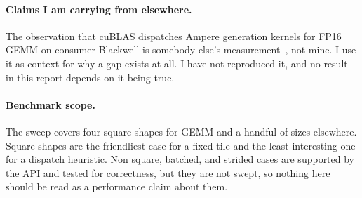 \paragraph{Claims I am carrying from elsewhere.} The observation that cuBLAS
dispatches Ampere generation kernels for FP16 GEMM on consumer Blackwell is
somebody else's measurement~\cite{cloudrift}, not mine. I use it as context for why
a gap exists at all. I have not reproduced it, and no result in this report depends
on it being true.

\paragraph{Benchmark scope.} The sweep covers four square shapes for GEMM and a
handful of sizes elsewhere. Square shapes are the friendliest case for a fixed tile
and the least interesting one for a dispatch heuristic. Non square, batched, and
strided cases are supported by the API and tested for correctness, but they are not
swept, so nothing here should be read as a performance claim about them.
